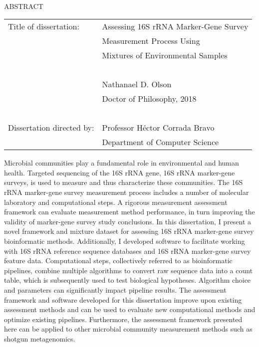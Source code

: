 
\hbox{\ }

\renewcommand{\baselinestretch}{1}
\small \normalsize

\begin{center}
\large{{ABSTRACT}}

\vspace{3em}

\end{center}
\hspace{-.15in}
\begin{tabular}{ll}
Title of dissertation:    & {\large  Assessing 16S rRNA Marker-Gene Survey}\\
&                     {\large  Measurement Process Using} \\
&                     {\large  Mixtures of Environmental Samples} \\
\ \\
&                          {\large  Nathanael D. Olson} \\
&                           {\large Doctor of Philosophy, 2018} \\
\ \\
Dissertation directed by: & {\large  Professor Héctor Corrada Bravo} \\
&               {\large  Department of Computer Science } \\
\end{tabular}

\vspace{3em}

\renewcommand{\baselinestretch}{2}
\large \normalsize

Microbial communities play a fundamental role in environmental and human health.
Targeted sequencing of the 16S rRNA gene, 16S rRNA marker-gene surveys, is used to measure and thus characterize these communities.
The 16S rRNA marker-gene survey measurement process includes a number of molecular laboratory and computational steps.
A rigorous measurement assessment framework can evaluate measurement method performance, in turn improving the validity of marker-gene survey study conclusions.
In this dissertation, I present a novel framework and mixture dataset for assessing 16S rRNA marker-gene survey bioinformatic methods.
Additionally, I developed software to facilitate working with 16S rRNA reference sequence databases and 16S rRNA marker-gene survey feature data.
Computational steps, collectively referred to as bioinformatic pipelines, combine multiple algorithms to convert raw sequence data into a count table, which is subsequently used to test biological hypotheses.
Algorithm choice and parameters can significantly impact pipeline results.
The assessment framework and software developed for this dissertation improve upon existing assessment methods and can be used to evaluate new computational methods and optimize existing pipelines.
Furthermore, the assessment framework presented here can be applied to other microbial community measurement methods such as shotgun metagenomics.

